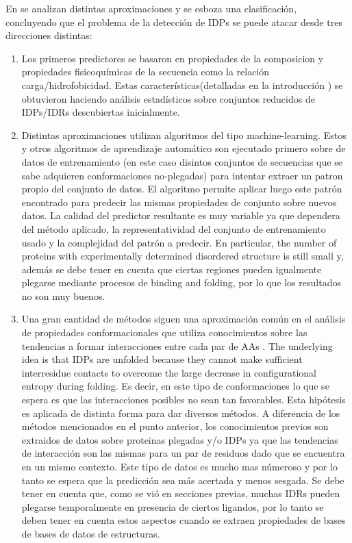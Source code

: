 En \cite{habchi2014introducing} se analizan distintas aproximaciones y se esboza una clasificación, concluyendo que el problema de la detección de IDPs 
se puede atacar desde tres direcciones distintas:
\begin{enumerate}

\item Los primeros predictores se basaron en propiedades de la composicion y propiedades fisicoquímicas de la secuencia como la relación carga/hidrofobicidad. 
Estas características(detalladas en la introducción ) se obtuvieron haciendo análisis estadísticos sobre conjuntos reducidos de IDPs/IDRs descubiertas inicialmente.

\item Distintas aproximaciones utilizan algoritmos del tipo machine-learning. Estos y otros algoritmos de aprendizaje automático son ejecutado primero sobre de datos de entrenamiento 
(en este caso disintos conjuntos de secuencias que se sabe adquieren conformaciones no-plegadas) para intentar extraer un patron propio del conjunto de datos.
El algoritmo permite aplicar luego este patrón encontrado para predecir las mismas propiedades de conjunto sobre nuevos datos. 
La calidad del predictor resultante es muy variable ya que dependera del método aplicado, la representatividad del conjunto de entrenamiento usado y la complejidad del patrón a predecir.
En particular, the number of proteins with experimentally determined disordered structure is still small y, además se debe tener en cuenta que ciertas regiones pueden igualmente plegarse mediante procesos de binding and folding,
por lo que los resultados no son muy buenos.


\item Una gran cantidad de métodos siguen una aproximación común en el análisis de propiedades conformacionales que utiliza conocimientos sobre las tendencias a formar interacciones entre cada par de AAs    . 
The underlying idea is that IDPs are unfolded because they cannot make sufficient interresidue contacts to overcome the large decrease in configurational entropy during folding.
Es decir, en este tipo de conformaciones lo que se espera es que las interacciones posibles no sean tan favorables.
Esta hipótesis es aplicada de distinta forma para dar diversos métodos.
A diferencia de los métodos mencionados en el punto anterior, los conocimientos previos son extraidos de datos sobre proteinas plegadas y/o IDPs ya que las tendencias de interacción son las mismas para un par de residuos dado que se encuentra en un mismo contexto.
Este tipo de datos es mucho mas númeroso y por lo tanto se espera que la predicción sea más acertada y menos sesgada.
Se debe tener en cuenta que, como se vió en secciones previas, muchas IDRs pueden plegarse temporalmente en presencia de ciertos ligandos, por lo tanto se deben tener en cuenta estos aspectos cuando se extraen propiedades de bases de bases de datos de estructuras.   
\end{enumerate}


